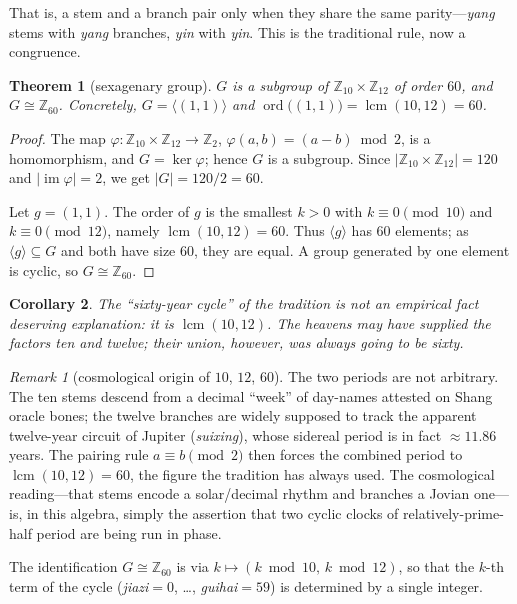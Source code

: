 \documentclass[11pt,a4paper]{article}
\newtheorem{theorem}{Theorem}[section]
\newtheorem{corollary}[theorem]{Corollary}
\theoremstyle{definition}
\theoremstyle{remark}
\newtheorem*{remark}{Remark}
\DeclareMathOperator{\lcm}{lcm}
\newcommand{\Z}{\mathbb{Z}}
\newcommand{\ord}{\operatorname{ord}}
\begin{document}
That is, a stem and a branch pair only when they share the same parity---\emph{yang} stems with \emph{yang} branches, \emph{yin} with \emph{yin}. This is the traditional rule, now a congruence.

\begin{theorem}[sexagenary group]\label{thm:sexagenary}
$G$ is a subgroup of $\Z_{10}\times\Z_{12}$ of order $60$, and $G\cong\Z_{60}$. Concretely, $G=\langle(1,1)\rangle$ and $\ord\big((1,1)\big)=\lcm(10,12)=60$.
\end{theorem}
\begin{proof}
The map $\varphi:\Z_{10}\times\Z_{12}\to\Z_2$, $\varphi(a,b)=(a-b)\bmod 2$, is a homomorphism, and $G=\ker\varphi$; hence $G$ is a subgroup. Since $|\Z_{10}\times\Z_{12}|=120$ and $|\operatorname{im}\varphi|=2$, we get $|G|=120/2=60$.

Let $g=(1,1)$. The order of $g$ is the smallest $k>0$ with $k\equiv0\pmod{10}$ and $k\equiv0\pmod{12}$, namely $\lcm(10,12)=60$. Thus $\langle g\rangle$ has $60$ elements; as $\langle g\rangle\subseteq G$ and both have size $60$, they are equal. A group generated by one element is cyclic, so $G\cong\Z_{60}$.
\end{proof}

\begin{corollary}
The ``sixty-year cycle'' of the tradition is not an empirical fact deserving explanation: it is $\lcm(10,12)$. The heavens may have supplied the factors ten and twelve; their union, however, was always going to be sixty.
\end{corollary}

\begin{remark}[cosmological origin of $10$, $12$, $60$]
The two periods are not arbitrary. The ten stems descend from a decimal ``week'' of day-names attested on Shang oracle bones; the twelve branches are widely supposed to track the apparent twelve-year circuit of Jupiter (\emph{suixing}), whose sidereal period is in fact $\approx11.86$ years. The pairing rule $a\equiv b\pmod2$ then forces the combined period to $\lcm(10,12)=60$, the figure the tradition has always used. The cosmological reading---that stems encode a solar/decimal rhythm and branches a Jovian one---is, in this algebra, simply the assertion that two cyclic clocks of relatively-prime-half period are being run in phase.
\end{remark}

The identification $G\cong\Z_{60}$ is via $k\mapsto(k\bmod 10,\,k\bmod 12)$, so that the $k$-th term of the cycle (\emph{jiazi}$=0$, \dots, \emph{guihai}$=59$) is determined by a single integer.
\end{document}
